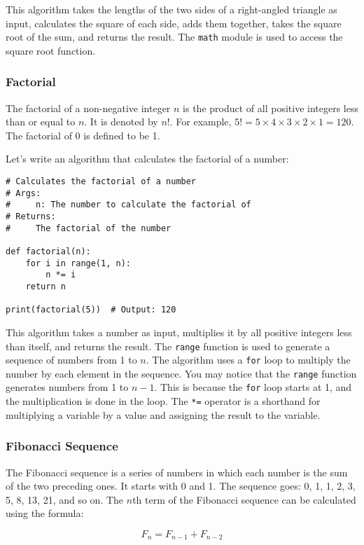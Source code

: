 This algorithm takes the lengths of the two sides of a right-angled triangle as input, calculates the square of each side, adds them together, takes the square root of the sum, and returns the result. The \texttt{math} module is used to access the square root function.

\subsubsection{Factorial}

The factorial of a non-negative integer $n$ is the product of all positive integers less than or equal to $n$. It is denoted by $n!$. For example, $5! = 5 \times 4 \times 3 \times 2 \times 1 = 120$. The factorial of 0 is defined to be 1.

Let's write an algorithm that calculates the factorial of a number:

\begin{lstlisting}
# Calculates the factorial of a number
# Args:
#     n: The number to calculate the factorial of
# Returns:
#     The factorial of the number

def factorial(n):
    for i in range(1, n):
        n *= i
    return n

print(factorial(5))  # Output: 120
\end{lstlisting}

This algorithm takes a number as input, multiplies it by all positive integers less than itself, and returns the result. The \texttt{range} function is used to generate a sequence of numbers from 1 to $n$. The algorithm uses a \texttt{for} loop to multiply the number by each element in the sequence. You may notice that the \texttt{range} function generates numbers from 1 to $n-1$. This is because the \texttt{for} loop starts at 1, and the multiplication is done in the loop. The \texttt{*=} operator is a shorthand for multiplying a variable by a value and assigning the result to the variable.

\subsubsection{Fibonacci Sequence}

The Fibonacci sequence is a series of numbers in which each number is the sum of the two preceding ones. It starts with 0 and 1. The sequence goes: 0, 1, 1, 2, 3, 5, 8, 13, 21, and so on. The $n$th term of the Fibonacci sequence can be calculated using the formula:

\begin{equation}
    F_n = F_{n-1} + F_{n-2}
\end{equation}
\newpage %

